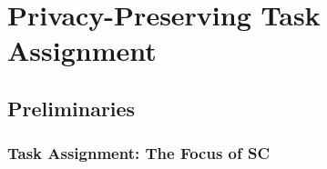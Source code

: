 \documentclass{USC-Thesis}
\numberwithin{equation}{chapter}
\begin{document}


\chapter{Privacy-Preserving Task Assignment}\label{ch.PPTA}

\section{Preliminaries}
\subsection{Task Assignment: The Focus of SC}
\end{document}
